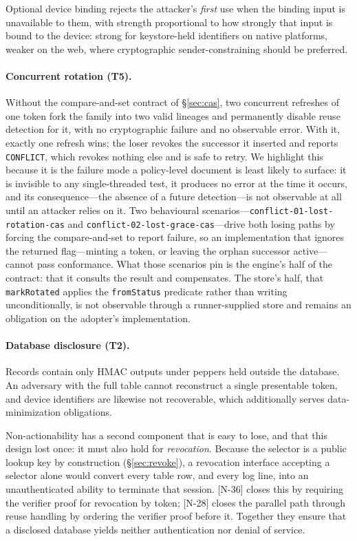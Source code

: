\documentclass[11pt]{article}
\begin{document}
Optional device binding rejects the attacker's \emph{first} use when the
binding input is unavailable to them, with strength proportional to how
strongly that input is bound to the device: strong for keystore-held
identifiers on native platforms, weaker on the web, where cryptographic
sender-constraining should be preferred.

\paragraph{Concurrent rotation (T5).} Without the compare-and-set contract of
\S\ref{sec:cas}, two concurrent refreshes of one token fork the family into
two valid lineages and permanently disable reuse detection for it, with no
cryptographic failure and no observable error. With it, exactly one refresh
wins; the loser revokes the successor it inserted and reports
\texttt{CONFLICT}, which revokes nothing else and is safe to retry. We
highlight this because it is the failure mode a policy-level document is
least likely to surface: it is invisible to any single-threaded test, it
produces no error at the time it occurs, and its consequence---the absence
of a future detection---is not observable at all until an attacker relies on
it. Two behavioural scenarios---\texttt{conflict-01-lost-rotation-cas} and
\texttt{conflict-02-lost-grace-cas}---drive both losing paths by forcing the
compare-and-set to report failure, so
an implementation that ignores the returned flag---minting a token, or
leaving the orphan successor active---cannot pass conformance. What those
scenarios pin is the engine's half of the contract: that it consults the
result and compensates. The store's half, that \texttt{markRotated} applies
the \texttt{fromStatus} predicate rather than writing unconditionally, is
not observable through a runner-supplied store and remains an obligation on
the adopter's implementation.

\paragraph{Database disclosure (T2).} Records contain only HMAC outputs under
peppers held outside the database. An adversary with the full table cannot
reconstruct a single presentable token, and device identifiers are likewise
not recoverable, which additionally serves data-minimization obligations.

Non-actionability has a second component that is easy to lose, and that this
design lost once: it must also hold for \emph{revocation}. Because the
selector is a public lookup key by construction (\S\ref{sec:revoke}), a
revocation interface accepting a selector alone would convert every table
row, and every log line, into an unauthenticated ability to terminate that
session. [N-36] closes this by requiring the verifier proof for revocation
by token; [N-28] closes the parallel path through reuse handling by ordering
the verifier proof before it. Together they ensure that a disclosed database
yields neither authentication nor denial of service.
\end{document}
